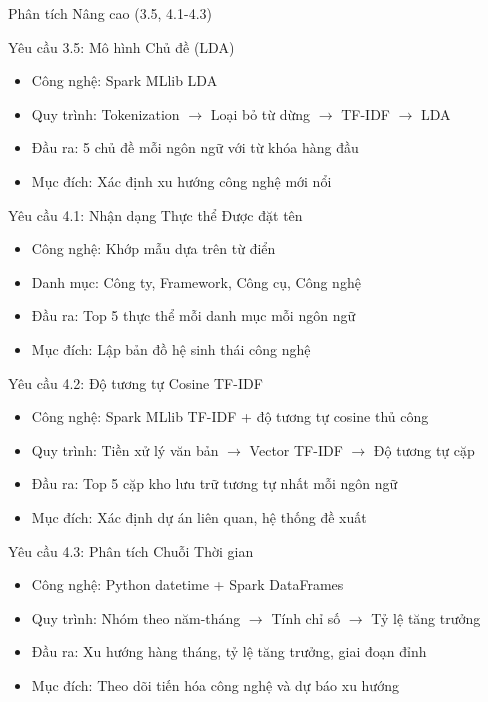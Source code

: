 \documentclass[aspectratio=169]{beamer}
\begin{document}
\begin{frame}{Phân tích Nâng cao (3.5, 4.1-4.3)}
    \begin{block}{Yêu cầu 3.5: Mô hình Chủ đề (LDA)}
        \begin{itemize}
            \item Công nghệ: Spark MLlib LDA
            \item Quy trình: Tokenization $\rightarrow$ Loại bỏ từ dừng $\rightarrow$ TF-IDF $\rightarrow$ LDA
            \item Đầu ra: 5 chủ đề mỗi ngôn ngữ với từ khóa hàng đầu
            \item Mục đích: Xác định xu hướng công nghệ mới nổi
        \end{itemize}
    \end{block}
    
    \begin{block}{Yêu cầu 4.1: Nhận dạng Thực thể Được đặt tên}
        \begin{itemize}
            \item Công nghệ: Khớp mẫu dựa trên từ điển
            \item Danh mục: Công ty, Framework, Công cụ, Công nghệ
            \item Đầu ra: Top 5 thực thể mỗi danh mục mỗi ngôn ngữ
            \item Mục đích: Lập bản đồ hệ sinh thái công nghệ
        \end{itemize}
    \end{block}
    
    \begin{block}{Yêu cầu 4.2: Độ tương tự Cosine TF-IDF}
        \begin{itemize}
            \item Công nghệ: Spark MLlib TF-IDF + độ tương tự cosine thủ công
            \item Quy trình: Tiền xử lý văn bản $\rightarrow$ Vector TF-IDF $\rightarrow$ Độ tương tự cặp
            \item Đầu ra: Top 5 cặp kho lưu trữ tương tự nhất mỗi ngôn ngữ
            \item Mục đích: Xác định dự án liên quan, hệ thống đề xuất
        \end{itemize}
    \end{block}
    
    \begin{block}{Yêu cầu 4.3: Phân tích Chuỗi Thời gian}
        \begin{itemize}
            \item Công nghệ: Python datetime + Spark DataFrames
            \item Quy trình: Nhóm theo năm-tháng $\rightarrow$ Tính chỉ số $\rightarrow$ Tỷ lệ tăng trưởng
            \item Đầu ra: Xu hướng hàng tháng, tỷ lệ tăng trưởng, giai đoạn đỉnh
            \item Mục đích: Theo dõi tiến hóa công nghệ và dự báo xu hướng
        \end{itemize}
    \end{block}
\end{frame}
\end{document}
